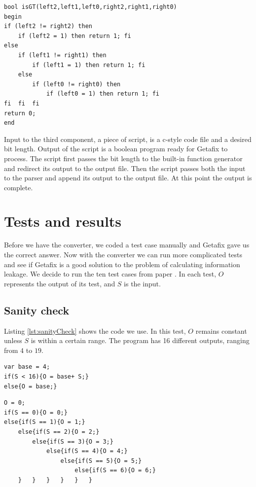 \lstset{language=C}  
\begin{lstlisting}[caption={Greater than operator as a function in boolean program with bit length of 2.},label=lst:isGT]
bool isGT(left2,left1,left0,right2,right1,right0)
begin
if (left2 != right2) then
	if (left2 = 1) then return 1; fi
else 
	if (left1 != right1) then
		if (left1 = 1) then	return 1; fi
	else 
		if (left0 != right0) then
			if (left0 = 1) then	return 1; fi
fi	fi	fi
return 0;
end
\end{lstlisting}

Input to the third component, a piece of script, is a c-style code file and a desired bit length. Output of the script is a boolean program ready for Getafix to process. The script first passes the bit length to the built-in function generator and redirect its output to the output file. Then the script passes both the input to the parser and append its output to the output file. At this point the output is complete.

\section{Tests and results}
Before we have the converter, we coded a test case manually and Getafix gave us the correct answer. Now with the converter we can run more complicated tests and see if Getafix is a good solution to the problem of calculating information leakage. We decide to run the ten test cases from paper \cite{meng_calculating_2011}. In each test, $O$ represents the output of its test, and $S$ is the input.
 
\subsection{Sanity check}
Listing \ref{lst:sanityCheck} shows the code we use. In this test, $O$ remains constant unless $S$ is within a certain range. The program has 16 different outputs, ranging from $4$ to $19$.

\lstset{language=C}  
\begin{lstlisting}[caption={Sanity check test program.},label=lst:sanityCheck]
var base = 4;
if(S < 16){O = base+ S;}
else{O = base;}
\end{lstlisting}

\lstset{language=C}  
\begin{lstlisting}[caption={Implict flow test program.},label=lst:implictFlow]
O = 0;
if(S == 0){O = 0;}
else{if(S == 1){O = 1;}
	else{if(S == 2){O = 2;}
		else{if(S == 3){O = 3;}
			else{if(S == 4){O = 4;}
				else{if(S == 5){O = 5;}
					else{if(S == 6){O = 6;}
	}	}	}	}	}	}
\end{lstlisting}
